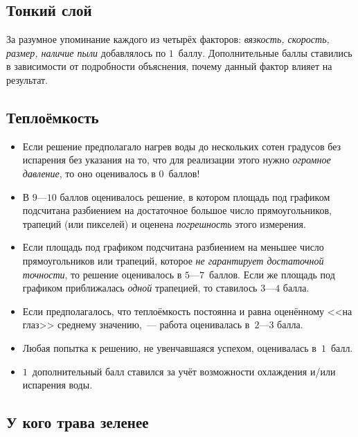 \documentclass[10pt, a4paper, oneside, fleqn]{article}
\newcommand\т{~--- }
\newenvironment{items}
{\begin{itemize}%
\setlength{\itemsep}{-1pt}}
{\end{itemize}}
\begin{document}
\subsection{Тонкий слой}

За разумное упоминание каждого из четырёх факторов: \emph{вязкость, скорость, размер, наличие пыли} добавлялось
по $1$~баллу. Дополнительные баллы ставились в зависимости от подробности
объяснения, почему данный фактор влияет на результат.

\subsection{Теплоёмкость}

\begin{items}
\item Если решение предполагало нагрев воды до нескольких сотен градусов без испарения
без указания на то, что для реализации этого нужно \emph{огромное давление}, то оно оценивалось в $0$~баллов!

\item В $9$---$10$ баллов оценивалось решение, в котором площадь под графиком подсчитана разбиением
на достаточное большое число прямоугольников, трапеций (или пикселей) и оценена \emph{погрешность} этого
измерения.

\item Если площадь под графиком подсчитана разбиением на меньшее число прямоугольников или трапеций,
которое \emph{не гарантирует достаточной точности}, то решение оценивалось в $5$---$7$~баллов.
Если же площадь под графиком приближалась \emph{одной} трапецией, то ставилось $3$---$4$ балла.

\item Если предполагалось, что теплоёмкость постоянна и равна оценённому <<на глаз>>
среднему значению,\т работа оценивалась в~$2$---$3$ балла.

\item Любая попытка к решению, не увенчавшаяся успехом, оценивалась в~$1$~балл.

\item $1$~дополнительный балл ставился за учёт возможности охлаждения и/или испарения воды.
\end{items}

\subsection{У кого трава зеленее}
\end{document}
